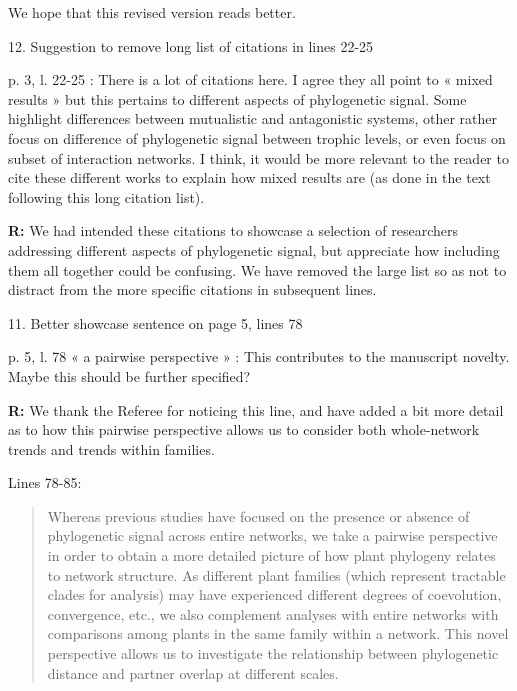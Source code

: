 \documentclass[12pt]{letter}
\newenvironment{refquote}{\bigskip \begin{it}}{\end{it}\smallskip}
\begin{document}
	  	We hope that this revised version reads better.


	12. Suggestion to remove long list of citations in lines 22-25


		\begin{refquote}
			p. 3, l. 22-25 : There is a lot of citations here. I agree they all point to « mixed results » but this pertains to different aspects of phylogenetic signal. Some highlight differences between mutualistic and antagonistic systems, other rather focus on difference of phylogenetic signal between trophic levels, or even focus on subset of interaction networks. I think, it would be more relevant to the reader to cite these different works to explain how mixed results are (as done in the text following this long citation list).
		\end{refquote}


		\textbf{R:} We had intended these citations to showcase a selection of researchers addressing different aspects of phylogenetic signal, but appreciate how including them all together could be confusing. We have removed the large list so as not to distract from the more specific citations in subsequent lines.


	11. Better showcase sentence on page 5, lines 78


		\begin{refquote}
			p. 5, l. 78 « a pairwise perspective » : This contributes to the manuscript novelty. Maybe this should be further specified?
		\end{refquote}


		\textbf{R:} We thank the Referee for noticing this line, and have added a bit more detail as to how this pairwise perspective allows us to consider both whole-network trends and trends within families.


		Lines 78-85:


		\begin{quotation}

			Whereas previous 
			studies have focused on the presence or absence of phylogenetic
			signal across entire networks, we take a pairwise perspective in
			order to obtain a more detailed picture of how plant phylogeny
			relates to network structure. As different plant families (which represent tractable clades for analysis) may have experienced different degrees of coevolution, convergence, etc., we also complement analyses with entire networks with comparisons among plants in the same family within a network. 
			This novel perspective allows us to investigate the relationship between phylogenetic distance and partner overlap at different scales. 

		\end{quotation}
\end{document}
